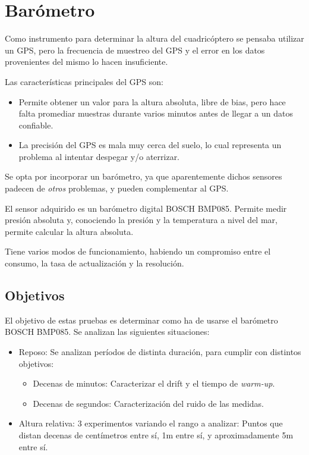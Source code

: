 \documentclass[main]{subfiles}
\begin{document}
\chapter{Bar\'ometro}
\label{chap:barometro}

Como instrumento para determinar la altura del cuadric\'optero se pensaba utilizar un GPS, pero la frecuencia de muestreo del GPS y el error en los datos provenientes del mismo lo hacen insuficiente.

Las caracter\'isticas principales del GPS son:
\begin{itemize}
\item Permite obtener un valor para la altura absoluta, libre de bias, pero hace falta promediar muestras durante varios minutos antes de llegar a un datos confiable.
\item  La precisi\'on del GPS es mala muy cerca del suelo, lo cual representa un problema al intentar despegar y/o aterrizar.
\end{itemize}

Se opta por incorporar un bar\'ometro, ya que aparentemente dichos sensores padecen de \textit{otros} problemas, y pueden complementar al GPS.

El sensor adquirido es un bar\'ometro digital BOSCH BMP085. Permite medir presi\'on absoluta y, conociendo la presi\'on y la temperatura a nivel del mar, permite calcular la altura absoluta.

Tiene varios modos de funcionamiento, habiendo un compromiso entre el consumo, la tasa de actualizaci\'on y la resoluci\'on.

\section{Objetivos}

El objetivo de estas pruebas es determinar como ha de usarse el bar\'ometro BOSCH BMP085. Se analizan las siguientes situaciones:

\begin{itemize}
\item Reposo: Se analizan per\'iodos de distinta duraci\'on, para cumplir con distintos objetivos:
  \begin{itemize}
  \item Decenas de minutos: Caracterizar el drift y el tiempo de \textit{warm-up}.
  \item Decenas de segundos: Caracterizaci\'on del ruido de las medidas.
  \end{itemize}
\item Altura relativa: 3 experimentos variando el rango a analizar: Puntos que distan decenas de cent\'imetros entre s\'i, 1m entre s\'i, y aproximadamente 5m entre s\'i.
\end{itemize}
\end{document}

